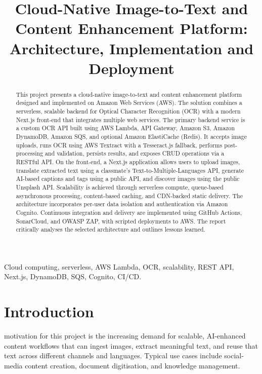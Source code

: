 \documentclass[conference]{IEEEtran}
\begin{document}
\title{Cloud-Native Image-to-Text and Content Enhancement Platform: Architecture, Implementation and Deployment}

\author{
}

\maketitle

\begin{abstract}
This project presents a cloud-native image-to-text and content enhancement platform designed and implemented on Amazon Web Services (AWS). The solution combines a serverless, scalable backend for Optical Character Recognition (OCR) with a modern Next.js front-end that integrates multiple web services. The primary backend service is a custom OCR API built using AWS Lambda, API Gateway, Amazon S3, Amazon DynamoDB, Amazon SQS, and optional Amazon ElastiCache (Redis). It accepts image uploads, runs OCR using AWS Textract with a Tesseract.js fallback, performs post-processing and validation, persists results, and exposes CRUD operations via a RESTful API. On the front-end, a Next.js application allows users to upload images, translate extracted text using a classmate's Text-to-Multiple-Languages API, generate AI-based captions and tags using a public API, and discover images using the public Unsplash API. Scalability is achieved through serverless compute, queue-based asynchronous processing, content-based caching, and CDN-backed static delivery. The architecture incorporates per-user data isolation and authentication via Amazon Cognito. Continuous integration and delivery are implemented using GitHub Actions, SonarCloud, and OWASP ZAP, with scripted deployments to AWS. The report critically analyses the selected architecture and outlines lessons learned.
\end{abstract}

\begin{IEEEkeywords}
Cloud computing, serverless, AWS Lambda, OCR, scalability, REST API, Next.js, DynamoDB, SQS, Cognito, CI/CD.
\end{IEEEkeywords}

\section{Introduction}
 motivation for this project is the increasing demand for scalable, AI-enhanced content workflows that can ingest images, extract meaningful text, and reuse that text across different channels and languages. Typical use cases include social-media content creation, document digitisation, and knowledge management.
\end{document}
